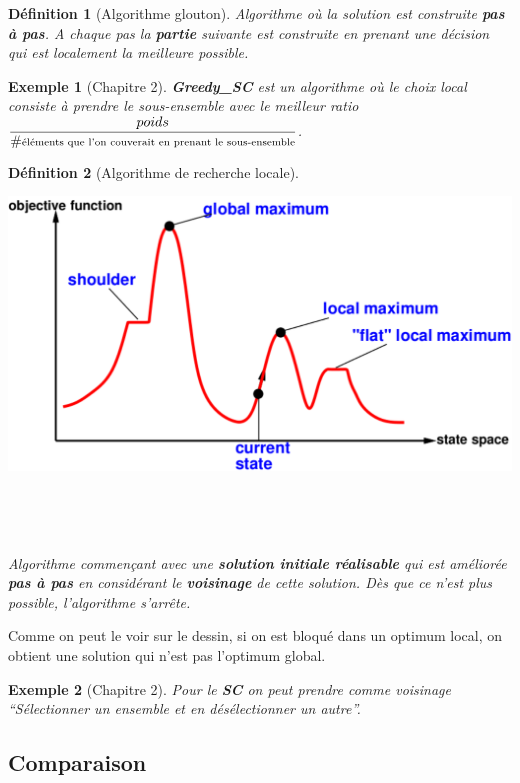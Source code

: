 \documentclass[12pt]{article}
\newcommand{\titre}[1]{\textcolor{title}{#1}}
\newtheorem{de}{D\'efinition}[section]
\newtheorem{exemple}{Exemple}[section]
\begin{document}
\begin{de}[Algorithme glouton]
Algorithme où la solution est construite \textbf{pas à pas}. A chaque pas la
\textbf{partie} suivante est construite en prenant une décision qui est
localement la meilleure possible.
\end{de}

\begin{exemple}[Chapitre 2] \textbf{Greedy\_SC} est un algorithme où le choix
local consiste à prendre le sous-ensemble avec le meilleur ratio
$\scriptsize \dfrac{poids}{\#\text{éléments que l'on couverait en prenant le sous-ensemble}
}$.
\end{exemple}

\begin{de}[Algorithme de recherche locale]
\begin{multicols}{2}
\includegraphics[scale=0.25]{graphique.pdf}
$ $\\$ $\\$ $\\$ $\\
Algorithme commençant avec une \textbf{solution initiale réalisable} qui est
améliorée \textbf{pas à pas} en considérant le \textbf{voisinage} de cette
solution. Dès que ce n'est plus possible, l'algorithme s'arrête.
\end{multicols}
\end{de}
Comme on peut le voir sur le dessin, si on est bloqué dans un optimum local,
on obtient une solution qui n'est pas l'optimum global.
\begin{exemple}[Chapitre 2]
Pour le \textbf{\titre{SC}} on peut prendre comme voisinage
``Sélectionner un ensemble et en désélectionner un autre''.
\end{exemple}

\subsection*{Comparaison}
\end{document}
